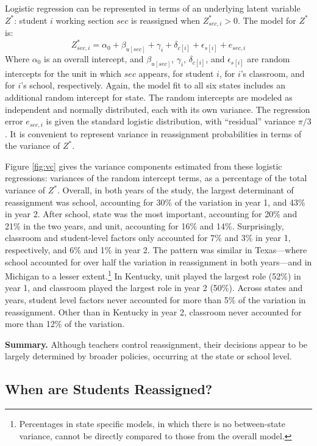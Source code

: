 \documentclass[12pt]{article}\usepackage[]{graphicx}\usepackage[]{color}
\begin{document}
Logistic regression can be represented in terms of an underlying
latent variable $Z^*$: student $i$ working section $sec$ is reassigned
when $Z_{sec,i}^*>0$.
The model for $Z^*$ is:
\begin{equation*}
 Z^*_{sec,i}=\alpha_0+\beta_{u[sec]}+\gamma_i+\delta_{c[i]}+\epsilon_{s[i]}+e_{sec,i}
\end{equation*}
Where $\alpha_0$ is an overall intercept,
and $\beta_{u[sec]}$, $\gamma_i$, $\delta_{c[i]}$, and $\epsilon_{s[i]}$
are random intercepts for the unit in which $sec$ appears, for student
$i$, for $i$'s classroom, and for $i$'s school, respectively.
Again, the model fit to all six states includes an additional random
intercept for state.
The random intercepts are modeled as independent and normally
distributed, each with its own variance.
The regression error $e_{sec,i}$ is given the standard logistic
distribution, with ``residual'' variance $\pi/3$.
It is convenient to represent variance in reassignment probabilities
in terms of the variance of $Z^*$.

Figure \ref{fig:vc} gives the variance components estimated from these
logistic regressions: variances of the random intercept terms, as a
percentage of the total variance of $Z^*$.
Overall, in both years of the study, the largest determinant of
reassignment was school, accounting for
30\% of the variation in year 1,
and 43\% in year 2.
After school, state was the most important, accounting for
20\% and
21\% in the two years, and unit,
accounting for 16\% and 14\%.
Surprisingly, classroom and student-level factors only accounted for
7\% and
3\% in year 1, respectively,
and 6\% and
1\% in year 2.
The pattern was similar in Texas---where school accounted for over half
the variation in reassignment in both years---and in Michigan to a
lesser extent.\footnote{Percentages in state specific models, in which
  there is no between-state variance, cannot be
  directly compared to those from the overall model.}
In Kentucky, unit played the largest role
(52\%) in year 1, and classroom played
the largest role in year 2 (50\%).
Across states and years, student level factors never accounted for
more than 5\% of
the variation in reassignment.
Other than in Kentucky in year 2, classroom never accounted for more
than 12\%  of
the variation.

\textbf{Summary.} Although teachers control reassignment, their decisions appear to be largely
determined by broader policies, occurring at the state or school level.


\subsection{When are Students Reassigned?}
\end{document}

